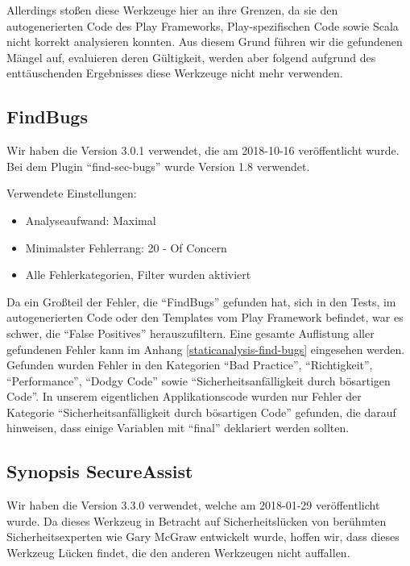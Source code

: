 \documentclass[12pt,DIV14,BCOR10mm,a4paper,parskip=half-,headsepline,headinclude,english,ngerman,bibliography=totocnumbered]{scrreprt}
\begin{document}
Allerdings stoßen diese Werkzeuge hier an ihre Grenzen, da sie den autogenerierten Code des Play Frameworks, Play-spezifischen Code sowie Scala nicht korrekt analysieren konnten.
Aus diesem Grund führen wir die gefundenen Mängel auf, evaluieren deren Gültigkeit, werden aber folgend aufgrund des enttäuschenden Ergebnisses diese Werkzeuge nicht mehr verwenden.

\subsection{FindBugs}

Wir haben die Version 3.0.1 verwendet, die am 2018-10-16 veröffentlicht wurde.
Bei dem Plugin \enquote{find-sec-bugs} wurde Version 1.8 verwendet.

Verwendete Einstellungen:

\begin{itemize}
  \item Analyseaufwand: Maximal
  \item Minimalster Fehlerrang: 20 - Of Concern
  \item Alle Fehlerkategorien, Filter wurden aktiviert
\end{itemize}

Da ein Großteil der Fehler, die \enquote{FindBugs} gefunden hat, sich in den Tests, im autogenerierten Code oder den Templates vom Play Framework befindet, war es schwer, die \enquote{False Positives} herauszufiltern.
Eine gesamte Auflistung aller gefundenen Fehler kann im Anhang \ref{staticanalysis-find-bugs} eingesehen werden.
Gefunden wurden Fehler in den Kategorien \enquote{Bad Practice}, \enquote{Richtigkeit}, \enquote{Performance}, \enquote{Dodgy Code} sowie \enquote{Sicherheitsanfälligkeit durch bösartigen Code}.
In unserem eigentlichen Applikationscode wurden nur Fehler der Kategorie \enquote{Sicherheitsanfälligkeit durch bösartigen Code} gefunden, die darauf hinweisen, dass einige Variablen mit \enquote{final} deklariert werden sollten.

\subsection{Synopsis SecureAssist}

Wir haben die Version 3.3.0 verwendet, welche am 2018-01-29 veröffentlicht wurde.
Da dieses Werkzeug in Betracht auf Sicherheitslücken von berühmten Sicherheitsexperten wie Gary McGraw entwickelt wurde, hoffen wir, dass dieses Werkzeug Lücken findet, die den anderen Werkzeugen nicht auffallen.
\end{document}
